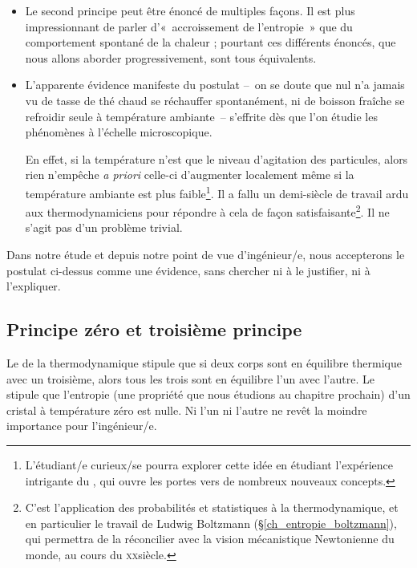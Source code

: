 		\begin{itemize}
			\item Le second principe peut être énoncé de multiples façons. Il est plus impressionnant de parler d’«~accroissement de l’entropie~» que du comportement spontané de la chaleur ; pourtant ces différents énoncés, que nous allons aborder progressivement, sont tous équivalents.
			\item L’apparente évidence manifeste du postulat --\ on se doute que nul n’a jamais vu de tasse de thé chaud se réchauffer spontanément, ni de boisson fraîche se refroidir seule à température ambiante\ -- s’effrite dès que l’on étudie les phénomènes à l’échelle microscopique. 

		En effet, si la température n’est que le niveau d’agitation des particules, alors rien n’empêche \textit{a priori} celle-ci d’augmenter localement même si la température ambiante est plus faible\footnote{L’étudiant/e curieux/se pourra explorer cette idée en étudiant l’expérience intrigante du \textit{}, qui ouvre les portes vers de nombreux nouveaux concepts.}. Il a fallu un demi-siècle de travail ardu aux thermodynamiciens pour répondre à cela de façon satisfaisante\footnote{C’est l’application des probabilités et statistiques à la thermodynamique, et en particulier le travail de Ludwig Boltzmann (\S\ref{ch_entropie_boltzmann}), qui permettra de la réconcilier avec la vision mécanistique Newtonienne du monde, au cours du \textsc{xx}\ieme siècle.}. Il ne s’agit pas d’un problème trivial.
		\end{itemize}

		Dans notre étude et depuis notre point de vue d’ingénieur/e, nous accepterons le postulat ci-dessus comme une évidence, sans chercher ni à le justifier, ni à l’expliquer.
		
		
	\subsection{Principe zéro et troisième principe}
	
		Le  de la thermodynamique stipule que si deux corps sont en équilibre thermique avec un troisième, alors tous les trois sont en équilibre l’un avec l’autre. Le  stipule que l’entropie (une propriété que nous étudions au chapitre prochain) d’un cristal à température zéro est nulle. Ni l’un ni l’autre ne revêt la moindre importance pour l’ingénieur/e.



